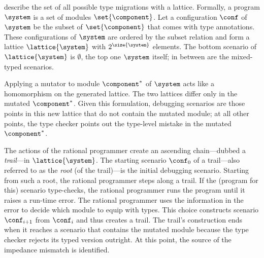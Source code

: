 
\citet{tfgnvf-popl-2016} describe the set of all possible type migrations with a
lattice. Formally, a program $\system$ is a set of modules $\set{\component}$.
Let a configuration $\conf$ of $\system$ be the subset of $\set{\component}$
that comes with type annotations. These configurations of $\system$ are ordered
by the subset relation and form a lattice $\lattice{\system}$ with
$2^{\size{\system}}$ elements. The bottom scenario of $\lattice{\system}$ is
$\emptyset$, the top one $\system$ itself; in between are the mixed-typed
scenarios.

Applying a mutator to module $\component^*$ of $\system$ acts like a homomorphism
on the generated lattice. The two lattices differ only in the mutated
$\component^*$. Given this formulation, debugging scenarios are those points in
this new lattice that do not contain the mutated module; at all other points, the type
checker points out the type-level mistake in the mutated $\component^*$.

The actions of the rational programmer create an ascending chain---dubbed a
\emph{trail}---in $\lattice{\system}$.  The starting scenario $\conf_0$ of a
trail---also referred to as the \emph{root} (of the trail)---is the initial
debugging scenario.  Starting from such a root, the rational
programmer steps along a trail. If the (program for this) scenario type-checks,
the rational programmer runs the program until it raises a run-time error.  The rational programmer
uses the information in the error to decide which module to equip with
types. This choice constructs scenario $\conf_{i+1}$ from $\conf_{i}$ and thus
creates a trail. The trail's construction ends when it reaches a scenario that
contains the mutated module because the type checker rejects its typed version
outright.  At this point, the source of the impedance mismatch is identified.
